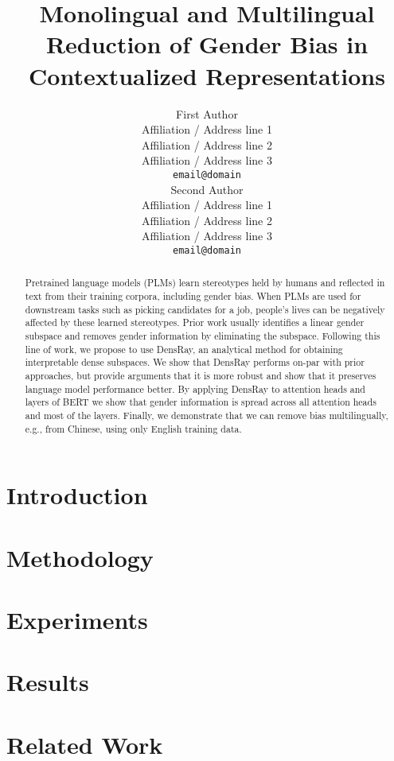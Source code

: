 \documentclass[11pt]{article}
\title{Monolingual and Multilingual Reduction of Gender Bias in Contextualized Representations}
\author{First Author \\
  Affiliation / Address line 1 \\
  Affiliation / Address line 2 \\
  Affiliation / Address line 3 \\
  {\tt email@domain} \\\And
  Second Author \\
  Affiliation / Address line 1 \\
  Affiliation / Address line 2 \\
  Affiliation / Address line 3 \\
  {\tt email@domain} \\}
\date{}
\begin{document}
\maketitle
\begin{abstract}
	
Pretrained language models (PLMs) learn stereotypes held by
humans and reflected in text from their training corpora,
including gender bias.  When PLMs are used for downstream
tasks such as picking candidates for a job, people's lives
can be negatively affected by these learned stereotypes.
Prior work usually identifies a linear gender subspace and
removes gender information by eliminating the
subspace. Following this line of work, we propose to use DensRay, an
analytical method for obtaining interpretable dense
subspaces. We show that DensRay performs on-par with prior
approaches, but provide arguments that it is more robust and show that it preserves language model performance better. By applying DensRay to attention heads and layers of BERT 
we show that gender information is spread across all attention heads and most of the layers.  Finally,
we demonstrate that we can remove bias multilingually, e.g.,
from Chinese, using only English training data.
	
\end{abstract}


\section{Introduction}


\section{Methodology}


\section{Experiments}


\section{Results}


%

\section{Related Work}

\end{document}

